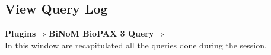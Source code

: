 \subsection{View Query Log}
\textbf{Plugins$\Rightarrow$BiNoM BioPAX 3 Query$\Rightarrow$}\\
In this window are recapitulated all the queries done during the session.

